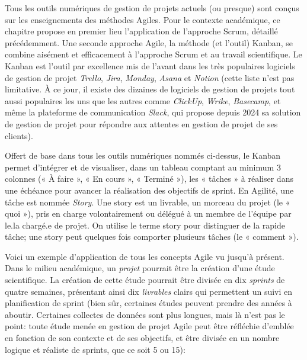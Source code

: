 \documentclass[
  letterpaper,
  DIV=11,
  numbers=noendperiod]{scrreprt}
\begin{document}
Tous les outils numériques de gestion de projets actuels (ou presque)
sont conçus sur les enseignements des méthodes Agiles. Pour le contexte
académique, ce chapitre propose en premier lieu l'application de
l'approche Scrum, détaillé précédemment. Une seconde approche Agile, la
méthode (et l'outil) Kanban, se combine aisément et efficacement à
l'approche Scrum et au travail scientifique. Le Kanban est l'outil par
excellence mis de l'avant dans les très populaires logiciels de gestion
de projet \emph{Trello}, \emph{Jira}, \emph{Monday}, \emph{Asana} et
\emph{Notion} (cette liste n'est pas limitative. À ce jour, il existe
des dizaines de logiciels de gestion de projets tout aussi populaires
les uns que les autres comme \emph{ClickUp}, \emph{Wrike},
\emph{Basecamp}, et même la plateforme de communication \emph{Slack},
qui propose depuis 2024 sa solution de gestion de projet pour répondre
aux attentes en gestion de projet de ses clients).

Offert de base dans tous les outils numériques nommés ci-dessus, le
Kanban permet d'intégrer et de visualiser, dans un tableau comptant au
minimum 3 colonnes (« À faire », « En cours », « Terminé »), les «
tâches » à réaliser dans une échéance pour avancer la réalisation des
objectifs de sprint. En Agilité, une tâche est nommée \emph{Story}. Une
story est un livrable, un morceau du projet (le « quoi »), pris en
charge volontairement ou délégué à un membre de l'équipe par le.la
chargé.e de projet. On utilise le terme story pour distinguer de la
rapide tâche; une story peut quelques fois comporter plusieurs tâches
(le « comment »).

Voici un exemple d'application de tous les concepts Agile vu jusqu'à
présent. Dans le milieu académique, un \emph{projet} pourrait être la
création d'une étude scientifique. La création de cette étude pourrait
être divisée en dix \emph{sprints} de quatre semaines, présentant ainsi
dix \emph{livrables} clairs qui permettent un suivi en planification de
sprint (bien sûr, certaines études peuvent prendre des années à aboutir.
Certaines collectes de données sont plus longues, mais là n'est pas le
point: toute étude menée en gestion de projet Agile peut être réfléchie
d'emblée en fonction de son contexte et de ses objectifs, et être
divisée en un nombre logique et réaliste de sprints, que ce soit 5 ou
15):
\end{document}
